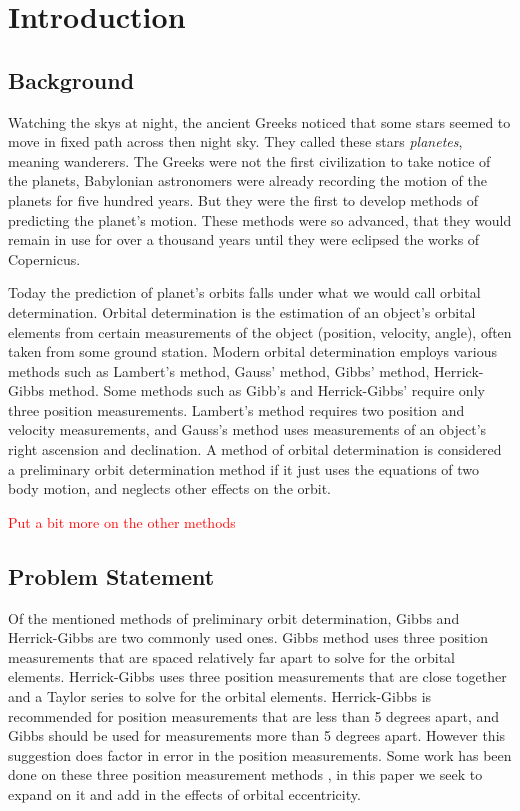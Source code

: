 \documentclass[12pt]{article}
\begin{document}
	\section{Introduction}
	\subsection{Background}
	Watching the skys at night, the ancient Greeks noticed that some stars seemed to move in fixed path across then night sky. They called these stars \textit{planetes}, meaning wanderers. The Greeks were not the first civilization to take notice of the planets, Babylonian astronomers were already recording the motion of the planets for five hundred years. But they were the first to develop methods of predicting the planet's motion. These methods were so advanced, that they would remain in use for over a thousand years until they were eclipsed the works of Copernicus\cite{lectureOnGreekAstro}. %
	
	Today the prediction of planet's orbits falls under what we would call orbital determination. Orbital determination is the estimation of an object's orbital elements from certain measurements of the object (position, velocity, angle), often taken from some ground station. Modern orbital determination employs various methods such as Lambert's method, Gauss' method, Gibbs' method, Herrick-Gibbs method. Some methods such as Gibb's and Herrick-Gibbs' require only three position measurements. Lambert's method requires two position and velocity measurements, and Gauss's method uses measurements of an object's right ascension and declination. A method of orbital determination is considered a preliminary orbit determination method if it just uses the equations of two body motion, and neglects other effects on the orbit.\par 
	
	
	
		\textcolor{red}{Put a bit more on the other methods}
		\subsection{Problem Statement}
		Of the mentioned methods of preliminary orbit determination, Gibbs and Herrick-Gibbs are two commonly used ones. Gibbs method uses three position measurements that are spaced relatively far apart to solve for the orbital elements. Herrick-Gibbs uses three position measurements that are close together and a Taylor series to solve for the orbital elements. Herrick-Gibbs is recommended for position measurements that are less than 5 degrees apart, and Gibbs should be used for measurements more than 5 degrees apart\cite{vallado2007fundamentals}. However this suggestion does factor in error in the position measurements. Some work has been done on these three position measurement methods \cite{Kaushick}, in this paper we seek to expand on it and add in the effects of orbital eccentricity.
		
\end{document}
